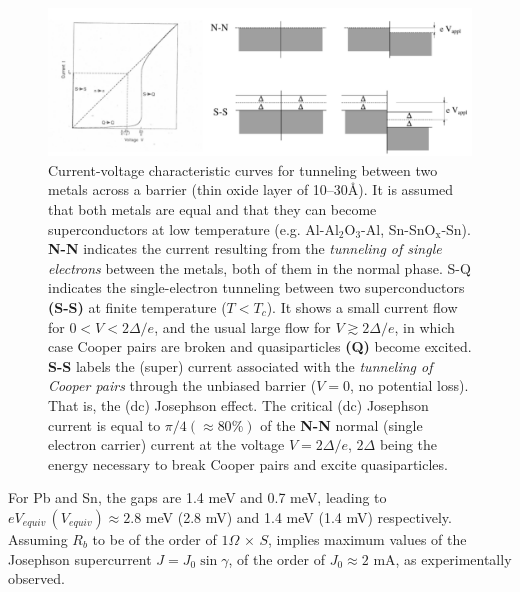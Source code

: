   \begin{figure}
  	\centerline{\includegraphics[width=17cm]{C6/figs_C6/fig4_6_1x}}
  	\caption{Current-voltage characteristic curves for tunneling between two metals across a barrier (thin oxide layer of 10--30\AA). It is assumed that both metals are  equal and that they can become superconductors at low temperature (e.g. Al-Al$_2$O$_3$-Al, Sn-SnO$_\text{x}$-Sn). \textbf{N-N} indicates the  current resulting from the \textit{tunneling of single electrons} between the metals, both of them in the normal phase. S-Q indicates the single-electron tunneling between two superconductors \textbf{(S-S)} at finite temperature ($T<T_c$). It shows a small current flow for $0<V<2\Delta/e$, and the usual large flow for $V\gtrsim2\Delta/e$, in which case Cooper pairs are broken and quasiparticles \textbf{(Q)} become excited. \textbf{S-S} labels the (super) current associated with the \textit{tunneling of Cooper pairs} through the unbiased barrier ($V=0$, no potential loss). That is, the (dc) Josephson effect. The critical (dc) Josephson current  is equal to $\pi/4(\approx80\%)$ of the \textbf{N-N}  normal (single electron carrier) current at the  voltage $V=2\Delta/e$, $2\Delta$ being the energy necessary to break Cooper pairs and excite quasiparticles.}\label{fig4.6.1}
  \end{figure}
  
  For Pb and Sn, the gaps are 1.4 meV and 0.7 meV, leading to $e V_{equiv} \,(V_{equiv})\approx 2.8$ meV (2.8 mV) and 1.4 meV (1.4 mV) respectively. Assuming $R_b$ to be of the order of $1\Omega\,\times\, S$, implies maximum values of the Josephson supercurrent $J=J_0\sin\gamma$, of the order of $J_0\approx 2$ mA, as experimentally observed.
 
